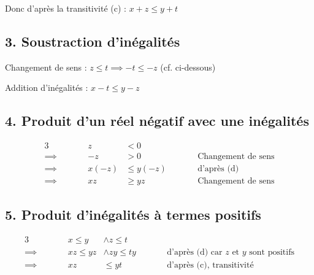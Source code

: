 \documentclass{report}
\begin{document}
Donc d'après la transitivité (c) : $ x  + z \leq y + t$ 

\subsection*{3. Soustraction d'inégalités}
 
Changement de sens : $z \leq t \implies -t \leq -z$ (cf. ci-dessous)

Addition d'inégalités : $x - t \leq y - z$ 

\subsection*{4. Produit d'un réel négatif avec une inégalités}

\begin{alignat*}{3}
	        &         &     z &< 0 \\
	\implies& \qquad  &    -z &> 0        &\qquad& \text{Changement de sens}\\
	\implies&         & x(-z) &\leq y(-z) &      & \text{d'après (d)}\\
	\implies&         &    xz &\geq yz    &      & \text{Changement de sens}
\end{alignat*}

\subsection*{5. Produit d'inégalités à termes positifs}

\begin{alignat*}{3}
	        &\qquad &  x \leq y  &\wedge z\leq t\\
	\implies&       & xz \leq yz &\wedge zy \leq ty &\qquad &\text{d'après (d) car $z$ et $y$ sont positifs} \\
	\implies&       &         xz &\leq yt           &       &\text{d'après (c), transitivité}
\end{alignat*}
\end{document}
